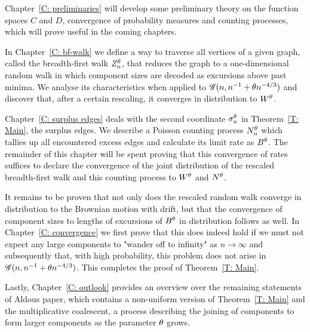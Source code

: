 Chapter~\ref{C: preliminaries} will develop some preliminary theory on the function spaces $C$ and $D$,
convergence of probability measures and counting processes, which will prove useful in the coming chapters.

In Chapter~\ref{C: bf-walk} we define a way to traverse all vertices of a given graph, called the breadth-first walk $Z_n^{\theta}$, 
that reduces the graph to a one-dimensional random walk in which component sizes are decoded as excursions above past minima.
We analyse its characteristics when applied to $\mathscr{G}(n, n^{-1} + \theta n^{-4/3})$ and discover that, after a certain rescaling, it converges in distribution to $W^{\theta}$.

Chapter~\ref{C: surplus edges} deals with the second coordinate $\mathcal{\sigma}^{\theta}_n$ in Theorem~\ref{T: Main}, the surplus edges.
We describe a Poisson counting process $N_n^{\theta}$ which tallies up all encountered excess edges and calculate its limit rate as $B^{\theta}$.
The remainder of this chapter will be spent proving that this convergence of rates suffices to declare the convergence of the joint distribution of
the rescaled breadth-first walk and this counting process to $W^{\theta}$ and $N^{\theta}$.

It remains to be proven that not only does the rescaled random walk converge in distribution to the Brownian motion with drift,
but that the convergence of component sizes to lengths of excursions of $B^{\theta}$ in distribution follows as well.
In Chapter~\ref{C: convergence} we first prove that this does indeed hold if we must not expect any large components to "wander off to infinity" as $n \rightarrow \infty$ and subsequently that, with high probability, this problem does not arise in $\mathscr{G}(n, n^{-1} + \theta n^{-4/3})$.
This completes the proof of Theorem~\ref{T: Main}.

Lastly, Chapter~\ref{C: outlook} provides an overview over the remaining statements of Aldous paper,
which contains a non-uniform version of Theorem~\ref{T: Main} and the multiplicative coalescent, 
a process describing the joining of components to form larger components as the parameter $\theta$ grows.


